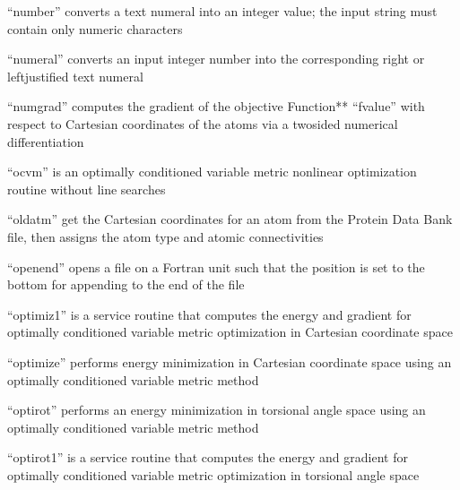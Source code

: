 \documentclass[letterpaper,11pt,english]{sphinxmanual}
\begin{document}

“number” converts a text numeral into an integer value; the input string must contain only numeric characters


“numeral” converts an input integer number into the corresponding right\sphinxhyphen{} or left\sphinxhyphen{}justified text numeral


“numgrad” computes the gradient of the objective Function** “fvalue” with respect to Cartesian coordinates of the atoms via a two\sphinxhyphen{}sided numerical differentiation


“ocvm” is an optimally conditioned variable metric nonlinear optimization routine without line searches


“oldatm” get the Cartesian coordinates for an atom from the Protein Data Bank file, then assigns the atom type and atomic connectivities


“openend” opens a file on a Fortran unit such that the position is set to the bottom for appending to the end of the file


“optimiz1” is a service routine that computes the energy and gradient for optimally conditioned variable metric optimization in Cartesian coordinate space


“optimize” performs energy minimization in Cartesian coordinate space using an optimally conditioned variable metric method


“optirot” performs an energy minimization in torsional angle space using an optimally conditioned variable metric method


“optirot1” is a service routine that computes the energy and gradient for optimally conditioned variable metric optimization in torsional angle space

\end{document}
